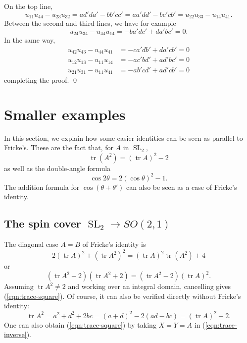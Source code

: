 \documentclass[11pt]{amsart}
\theoremstyle{definition}
\numberwithin{figure}{section}
\numberwithin{equation}{section}
\numberwithin{table}{section}
\newcommand{\SL}{\operatorname{SL}}
\newcommand{\tr}{\operatorname{tr}}
\begin{document}
On the top line,
\[
u_{11}u_{44} - u_{23}u_{32} = ad'da'-bb'cc' = aa'dd' - bc'cb' = u_{22}u_{33} - u_{14}u_{41}
.
\]
Between the second and third lines, we have for example
\[
u_{24}u_{34}-u_{44}u_{14}=-ba'dc'+da'bc' = 0.
\]
In the same way,
\begin{align*}
u_{42}u_{43}-u_{44}u_{41} &= -ca'db'+da'cb' = 0\\
u_{12}u_{13}-u_{11}u_{14} &= -ac'bd'+ad'bc' = 0 \\
u_{21}u_{31}-u_{11}u_{41} &= -ab'cd'+ad'cb' = 0
\end{align*}
completing the proof.
\qed

\section{Smaller examples} \label{sec:smaller-examples}

In this section, we explain how some easier identities can be seen as parallel to Fricke's.
These are the fact that, for $A$ in $\SL_2$,
\begin{equation} \label{eqn:trace-square}
\tr(A^2)  = (\tr{A})^2 - 2
\end{equation}
as well as the double-angle formula
\begin{equation}
\cos{2\theta} = 2(\cos{\theta})^2 - 1.
\end{equation}
The addition formula for $\cos(\theta+\theta')$ can also be seen as a case of Fricke's identity.

\subsection{The spin cover $\SL_2 \rightarrow SO(2,1)$}

The diagonal case $A=B$ of Fricke's identity is
\[
2(\tr{A})^2 + (\tr{A^2})^2 = (\tr{A})^2 \tr(A^2) + 4
\]
or
\[
(\tr{A^2}-2)(\tr{A^2}+2)=(\tr{A^2}-2)(\tr{A})^2.
\]
Assuming $\tr{A^2} \neq 2$ and working over an integral domain, cancelling gives (\ref{eqn:trace-square}).
Of course, it can also be verified directly without Fricke's identity:
\[
\tr{A^2} = a^2+d^2+2bc = (a+d)^2 - 2(ad-bc) = (\tr{A})^2-2.
\]
One can also obtain (\ref{eqn:trace-square}) by taking $X=Y=A$ in (\ref{eqn:trace-inverse}).
\end{document}
